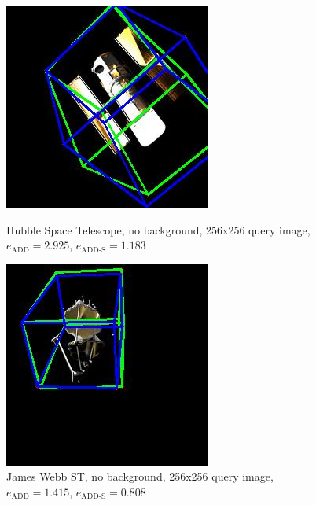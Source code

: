 \begin{figure}[h]
    \centering
    \begin{minipage}{0.45\linewidth}
        \centering
        \includegraphics[width=\linewidth]{data/fig3.jpg} %
        \caption{Hubble Space Telescope, no background, 256x256 query image, $e_\mathrm{ADD}=2.925$, $e_{\mathrm{ADD}\text{-}\mathrm{S}}=1.183$ }
        \label{fig:fig3}
    \end{minipage}\hfill
    \begin{minipage}{0.45\linewidth}
        \centering
        \includegraphics[width=\linewidth]{data/fig4.jpg} %
        \caption{James Webb ST, no background, 256x256 query image, $e_\mathrm{ADD}=1.415$, $e_{\mathrm{ADD}\text{-}\mathrm{S}}=0.808$ }
        \label{fig:fig4}
    \end{minipage}
\end{figure}

